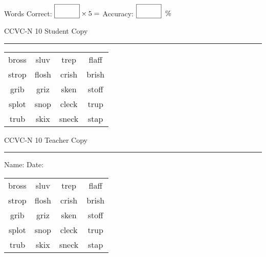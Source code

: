 \documentclass{memoir}
\begin{document}
\small

Words Correct: $\fbox{\phantom{\huge 100}} \times 5 = $ Accuracy: $\fbox{\phantom{\huge 100}}\;\; \%$ 

\vfill

\newpage


\footnotesize \noindent
CCVC-N 10 \hfill Student Copy
\smallskip
\hrule

\Large

\setlength{\tabcolsep}{14pt}
\def\arraystretch{3}

{\selectfont


\begin{vplace}[0.5]
\begin{center}
\begin{tabular}{cccc}
bross       & sluv & trep & flaff \\
strop & flosh & crish & brish \\
grib                    & griz & sken & stoff \\
splot & snop & cleck             & trup       \\
trub & skix & sneck & stap \\
\end{tabular}
\end{center}
\end{vplace}

}

\newpage

\footnotesize \noindent
CCVC-N 10 \hfill Teacher Copy
\smallskip
\hrule

\small

\vfill

\noindent
Name: \underline{\hspace{1.75in}} \hfill Date: \underline{\hspace{1in}}

\Large

{\selectfont


\begin{vplace}[0.5]
\begin{center}
\begin{tabular}{cccc}
bross       & sluv & trep & flaff \\
strop & flosh & crish & brish \\
grib                    & griz & sken & stoff \\
splot & snop & cleck             & trup       \\
trub & skix & sneck & stap \\
\end{tabular}
\end{center}
\end{vplace}



}
\end{document}
